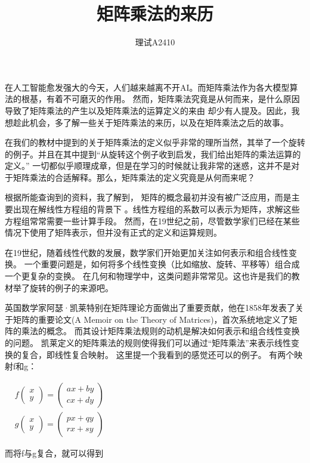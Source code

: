 \documentclass[12pt,a4paper]{article}%
\title{\fontsize{18pt}{27pt}\selectfont%
	{\heiti
		矩阵乘法的来历}}%
\author{\fontsize{12pt}{18pt}\selectfont%
{\fontsize{10.5pt}{15.75pt}\selectfont%
{\fangsong%
理试A2410}}}%
\date{}%
\begin{document}
在人工智能愈发强大的今天，人们越来越离不开AI。而矩阵乘法作为各大模型算法的根基，有着不可磨灭的作用。
然而，矩阵乘法究竟是从何而来，是什么原因导致了矩阵乘法的产生以及矩阵乘法的运算定义的来由
却少有人提及。因此，我想趁此机会，多了解一些关于矩阵乘法的来历，以及在矩阵乘法之后的故事。

在我们的教材中提到的关于矩阵乘法的定义似乎非常的理所当然，其举了一个旋转的例子。并且在其中提到“从旋转这个例子收到启发，我们给出矩阵的乘法运算的定义。”
一切都似乎顺理成章，但是在学习的时候就让我非常的迷惑，这并不是对于矩阵乘法的合适解释。那么，矩阵乘法的定义究竟是从何而来呢？

根据所能查询到的资料，我了解到，
矩阵的概念最初并没有被广泛应用，而是主要出现在解线性方程组的背景下
。线性方程组的系数可以表示为矩阵，求解这些方程组常常需要一些计算手段。
然而，在19世纪之前，尽管数学家们已经在某些情况下使用了矩阵表示，但并没有正式的定义和运算规则。

在19世纪，随着线性代数的发展，数学家们开始更加关注如何表示和组合线性变换。
一个重要问题是，如何将多个线性变换（比如缩放、旋转、平移等）组合成一个更复杂的变换。
在几何和物理学中，这类问题非常常见。这也许是我们的教材举了旋转的例子的来源吧。

英国数学家阿瑟·凯莱特别在矩阵理论方面做出了重要贡献，他在1858年发表了关于矩阵的重要论文(A Memoir on the Theory of Matrices)，首次系统地定义了矩阵的乘法的概念。
而其设计矩阵乘法规则的动机是解决如何表示和组合线性变换的问题。
凯莱定义的矩阵乘法的规则使得我们可以通过“矩阵乘法”来表示线性变换的复合，即线性复合映射。
这里提一个我看到的感觉还可以的例子。
有两个映射f和g：
\begin{center}
$
\begin{aligned}
&f\begin{pmatrix}
    x \\
    y
\end{pmatrix}=\begin{pmatrix}
    ax + by \\
    cx + dy
\end{pmatrix}\\
&g\begin{pmatrix}
    x \\
    y
\end{pmatrix}=\begin{pmatrix}
    px + qy \\
    rx + sy
\end{pmatrix}
\end{aligned}
$
\end{center}

而将f与g复合，就可以得到
\end{document}
